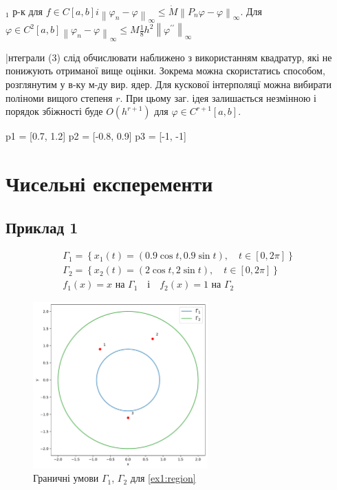 \documentclass[14pt,a4paper]{extarticle}
\newcounter{e}
\numberwithin{equation}{section}
\begin{document}
 $_{1}$ р-к для $f \in C[a, b] i\left\|\varphi_{n}-\varphi\right\|_{\infty} \leq \dot{M}\left\|P_{n} \varphi-\varphi\right\|_{\infty}$. Для
 $\varphi \in C^{2}[a, b]\left\|\varphi_{n}-\varphi\right\|_{\infty} \leq M \frac{1}{8} h^{2}\left\|\varphi^{\prime \prime}\right\|_{\infty}$


 |нтеграли (3) слід обчислювати наближено з використанням квадратур, які не понижують отриманої вище оцінки. Зокрема можна скористатись способом, розглянутим у в-ку м-ду вир. ядер.
 Для кускової інтерполяцї можна вибирати поліноми вищого степеня $r .$ При цьому заг. ідея залишається незмінною і порядок збіжності буде $O\left(h^{r+1}\right)$ для $\varphi \in C^{r+1}[a, b] .$
 
 
 p1 = [0.7, 1.2]
 p2 = [-0.8, 0.9]
 p3 = [-1, -1]
 \newpage
 \thispagestyle{empty}
 \section{Чисельні експеременти}
\subsection{Приклад 1}

	\begin{equation}
		\label{ex1}
		\begin{array}{l}
			\displaystyle
			\Gamma_{1}=\left\{x_{1}(t)=(0.9 \cos t, 0.9 \sin t), \quad t \in[0,2 
			\pi]\right\} \\
			
			\displaystyle
			\Gamma_{2}=\left\{x_{2}(t)=(2 \cos t, 2 \sin t), \quad  t \in[0,2 \pi]\right\} \\[0.1cm]
			
			\displaystyle
			f_{1}(x)=x  \text { на } \Gamma_{1} \quad \text {і} \quad
			f_{2}(x)=1  \text { на } \Gamma_{2}
		\end{array}
	\end{equation}




  
  \begin{figure}[h]
  	\includegraphics[width=0.6\textwidth]{resources/curves_and_points.pdf}
  	\caption{Граничні умови $\Gamma_1$, $\Gamma_2$ для \ref{ex1:region}}
  \end{figure}
\end{document}
